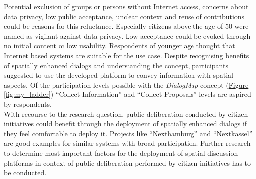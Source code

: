 Potential exclusion of groups or persons without Internet access, concerns about data privacy, low public acceptance, unclear context and reuse of contributions could be reasons for this reluctance. Especially citizens above the age of 50 were named as vigilant against data privacy. Low acceptance could be evoked through no initial content or low usability. Respondents of younger age thought that Internet based systems are suitable for the use case. Despite recognising benefits of spatially enhanced dialogs and understanding the concept, participants suggested to use the developed platform to convey information with spatial aspects. Of the participation levels possible with the \textit{DialogMap} concept (\hyperref[fig:my_ladder]{Figure \ref{fig:my_ladder}}) ``Collect Information'' and ``Collect Proposals'' levels are aspired by respondents.\\
With recourse to the research question, public deliberation conducted by citizen initiatives could benefit through the deployment of spatially enhanced dialogs if they feel comfortable to deploy it. Projects like ``Nexthamburg'' and ``Nextkassel'' are good examples for similar systems with broad participation. Further research to determine most important factors for the deployment of spatial discussion platforms in context of public deliberation performed by citizen initiatives has to be conducted.



